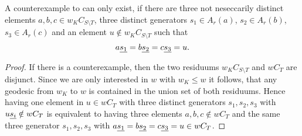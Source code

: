 \begin{lemm}
	\label{counterexample-simplification2}
	A counterexample to  can only exist, if there are three not
	neseccarily distinct elements $a,b,c \in w_K C_{S \setminus T}$, three
	distinct generators $s_1 \in A_r(a)$, $s_2 \in A_r(b)$, $s_3 \in A_r(c)$ and an
	element $u \notin w_K C_{S \setminus T}$ such that
	$$ a \underline{s_1} = b \underline{s_2} = c \underline{s_3} = u. $$

	\begin{proof}
		If there is a counterexample, then the two residuums $w_K C_{S \setminus T}$ and
		$w C_T$ are disjunct. Since we are only interested in $w$ with $w_K \leq w$
		it follows, that any geodesic from $w_K$ to $w$ is contained in the union set
		of both residuums. Hence having one element in $u \in w C_T$ with three distinct
		generators $s_1,s_2,s_3$ with $u \underline{s_i} \notin w C_T$ is equivalent to having
		three elements $a,b,c \notin w C_T$ and the same three generator $s_1,s_2,s_3$
		with $a \underline{s_1} = b \underline{s_2} = c \underline{s_3} = u \in w C_T$.
	\end{proof}
\end{lemm}